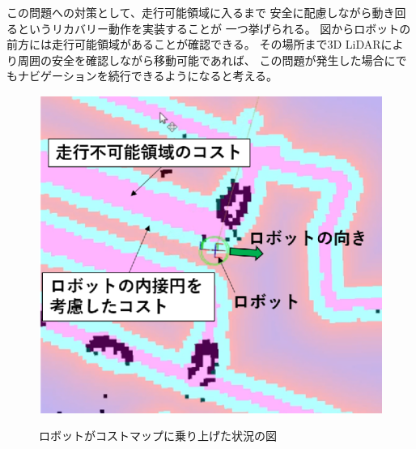 この問題への対策として、走行可能領域に入るまで
安全に配慮しながら動き回るというリカバリー動作を実装することが
一つ挙げられる。
図からロボットの前方には走行可能領域があることが確認できる。
その場所まで3D LiDARにより周囲の安全を確認しながら移動可能であれば、
この問題が発生した場合にでもナビゲーションを続行できるようになると考える。
\begin{figure}[h]
  \centering
  \includegraphics[width=0.9\linewidth]{figs/mugimaru_result.eps}
  \label{fig:mugimaru_result}
  \caption{ロボットがコストマップに乗り上げた状況の図} 
\end{figure}

